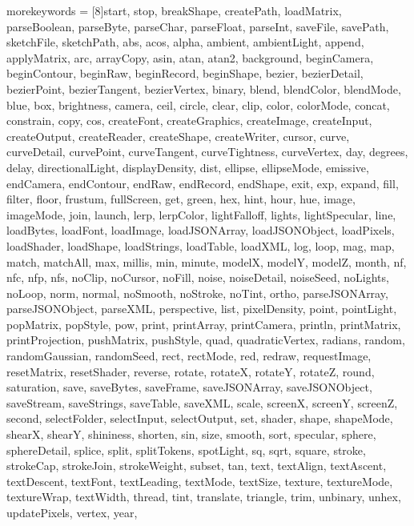 {	%
	morekeywords = [8]{start, stop, breakShape, createPath, loadMatrix, parseBoolean, parseByte, parseChar, parseFloat, parseInt, saveFile, savePath, sketchFile, sketchPath, abs, acos, alpha, ambient, ambientLight, append, applyMatrix, arc, arrayCopy, asin, atan, atan2, background, beginCamera, beginContour, beginRaw, beginRecord, beginShape, bezier, bezierDetail, bezierPoint, bezierTangent, bezierVertex, binary, blend, blendColor, blendMode, blue, box, brightness, camera, ceil, circle, clear, clip, color, colorMode, concat, constrain, copy, cos, createFont, createGraphics, createImage, createInput, createOutput, createReader, createShape, createWriter, cursor, curve, curveDetail, curvePoint, curveTangent, curveTightness, curveVertex, day, degrees, delay, directionalLight, displayDensity, dist, ellipse, ellipseMode, emissive, endCamera, endContour, endRaw, endRecord, endShape, exit, exp, expand, fill, filter, floor, frustum, fullScreen, get, green, hex, hint, hour, hue, image, imageMode, join, launch, lerp, lerpColor, lightFalloff, lights, lightSpecular, line, loadBytes, loadFont, loadImage, loadJSONArray, loadJSONObject, loadPixels, loadShader, loadShape, loadStrings, loadTable, loadXML, log, loop, mag, map, match, matchAll, max, millis, min, minute, modelX, modelY, modelZ, month, nf, nfc, nfp, nfs, noClip, noCursor, noFill, noise, noiseDetail, noiseSeed, noLights, noLoop, norm, normal, noSmooth, noStroke, noTint, ortho, parseJSONArray, parseJSONObject, parseXML, perspective, list, pixelDensity, point, pointLight, popMatrix, popStyle, pow, print, printArray, printCamera, println, printMatrix, printProjection, pushMatrix, pushStyle, quad, quadraticVertex, radians, random, randomGaussian, randomSeed, rect, rectMode, red, redraw, requestImage, resetMatrix, resetShader, reverse, rotate, rotateX, rotateY, rotateZ, round, saturation, save, saveBytes, saveFrame, saveJSONArray, saveJSONObject, saveStream, saveStrings, saveTable, saveXML, scale, screenX, screenY, screenZ, second, selectFolder, selectInput, selectOutput, set, shader, shape, shapeMode, shearX, shearY, shininess, shorten, sin, size, smooth, sort, specular, sphere, sphereDetail, splice, split, splitTokens, spotLight, sq, sqrt, square, stroke, strokeCap, strokeJoin, strokeWeight, subset, tan, text, textAlign, textAscent, textDescent, textFont, textLeading, textMode, textSize, texture, textureMode, textureWrap, textWidth, thread, tint, translate, triangle, trim, unbinary, unhex, updatePixels, vertex, year},
}

